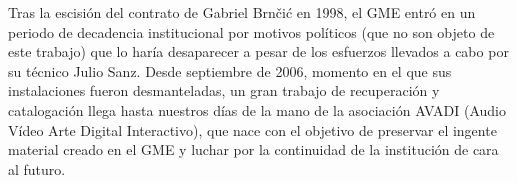 Tras la escisión del contrato de Gabriel Brnčić en 1998, el GME entró en un periodo de decadencia institucional por motivos políticos (que no son objeto de este trabajo) que lo haría desaparecer a pesar de los esfuerzos llevados a cabo por su técnico Julio Sanz. Desde septiembre de 2006, momento en el que sus instalaciones fueron desmanteladas, un gran trabajo de recuperación y catalogación llega hasta nuestros días de la mano de la asociación AVADI (Audio Vídeo Arte Digital Interactivo), que nace con el objetivo de preservar el ingente material creado en el GME y luchar por la continuidad de la institución de cara al futuro. 